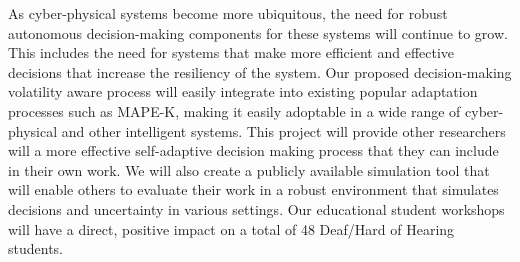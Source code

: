 \documentclass[11pt]{proposalnsf}
\begin{document}
As cyber-physical systems become more ubiquitous, the need for robust autonomous decision-making components for these systems will continue to grow. This includes the need for systems that make more efficient and effective decisions that increase the resiliency of the system. Our proposed decision-making volatility aware process will easily integrate into existing popular adaptation processes such as MAPE-K, making it easily adoptable in a wide range of cyber-physical and other intelligent systems. This project will provide other researchers will a more effective self-adaptive decision making process that they can include in their own work. We will also create a publicly available simulation tool that will enable others to evaluate their work in a robust environment that simulates decisions and uncertainty in various settings. Our educational student workshops will have a direct, positive impact on a total of 48 Deaf/Hard of Hearing students.




\end{document}
